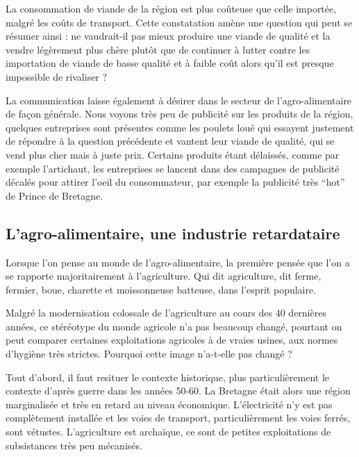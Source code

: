 \documentclass[a4paper,12pt]{report}
\begin{document}
			La consommation de viande de la région est plus coûteuse que celle importée, malgré les coûts de transport. Cette constatation amène une question qui peut se résumer ainsi : ne vaudrait-il pas mieux produire une viande de qualité et la vendre légèrement plus chère plutôt que de continuer à lutter contre les importation de viande de basse qualité et à faible coût alors qu’il est presque impossible de rivaliser ?
			
			La communication laisse également à désirer dans le secteur de l’agro-alimentaire de façon générale. Nous voyons très peu de publicité sur les produits de la région, quelques entreprises sont présentes comme les poulets loué qui essayent justement de répondre à la question précédente et vantent leur viande de qualité, qui se vend plus cher mais à juste prix.
			Certains produits étant délaissés, comme par exemple l’artichaut, les entreprises se lancent dans des campagnes de publicité décalés pour attirer l’oeil du consommateur, par exemple la publicité très “hot” de Prince de Bretagne.
			
		\subsection{L'agro-alimentaire, une industrie retardataire}
			Lorsque l’on pense au monde de l’agro-alimentaire, la première pensée que l’on a se rapporte majoritairement à l’agriculture. Qui dit agriculture, dit ferme, fermier, boue, charette et moissonneuse batteuse, dans l’esprit populaire.
			
			Malgré la modernisation colossale de l’agriculture au cours des 40 dernières années, ce stéréotype du monde agricole n’a pas beaucoup changé, pourtant on peut comparer certaines exploitations agricoles à de vraies usines, aux normes d’hygiène très strictes. Pourquoi cette image n’a-t-elle pas changé ?
			
			Tout d’abord, il faut resituer le contexte historique, plus particulièrement le contexte d’après guerre dans les années 50-60. La Bretagne était alors une région marginalisée et très en retard au niveau économique. L’électricité n’y est pas complètement installée et les voies de transport, particulièrement les voies ferrés, sont vétustes. L’agriculture est archaïque, ce sont de petites exploitations de subsistances très peu mécanisés.
			
\end{document}
